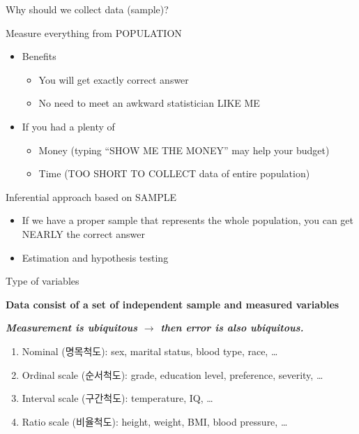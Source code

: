 \documentclass[9pt,ignorenonframetext,xcolor=dvipsnames]{beamer}
\providecommand{\tightlist}{%
  \setlength{\itemsep}{0pt}\setlength{\parskip}{0pt}}
\newlength{\wideitemsep}
\let\olditem\item
\renewcommand{\item}{\setlength{\itemsep}{\wideitemsep}\olditem}
\begin{document}
\begin{frame}{Why should we collect data (sample)?}

\begin{block}{Measure everything from POPULATION}

\begin{itemize}
\tightlist
\item
  Benefits

  \begin{itemize}
  \tightlist
  \item
    You will get exactly correct answer
  \item
    No need to meet an awkward statistician LIKE ME
  \end{itemize}
\item
  If you had a plenty of

  \begin{itemize}
  \tightlist
  \item
    Money (typing ``SHOW ME THE MONEY'' may help your budget)
  \item
    Time (TOO SHORT TO COLLECT data of entire population)
  \end{itemize}
\end{itemize}

\end{block}

\begin{block}{Inferential approach based on SAMPLE}

\begin{itemize}
\tightlist
\item
  If we have a proper sample that represents the whole population, you
  can get NEARLY the correct answer
\item
  Estimation and hypothesis testing
\end{itemize}

\end{block}

\end{frame}

\begin{frame}{Type of variables}

\textbf{Data consist of a set of independent sample and measured variables}

\textbf{\textit{Measurement is ubiquitous $\rightarrow$ then error is also ubiquitous.}}

\begin{enumerate}
\def\labelenumi{\arabic{enumi}.}
\tightlist
\item
  Nominal (명목척도): sex, marital status, blood type, race, \ldots{}
\item
  Ordinal scale (순서척도): grade, education level, preference,
  severity, \ldots{}
\item
  Interval scale (구간척도): temperature, IQ, \ldots{}
\item
  Ratio scale (비율척도): height, weight, BMI, blood pressure, \ldots{}
\end{enumerate}

\end{frame}
\end{document}
